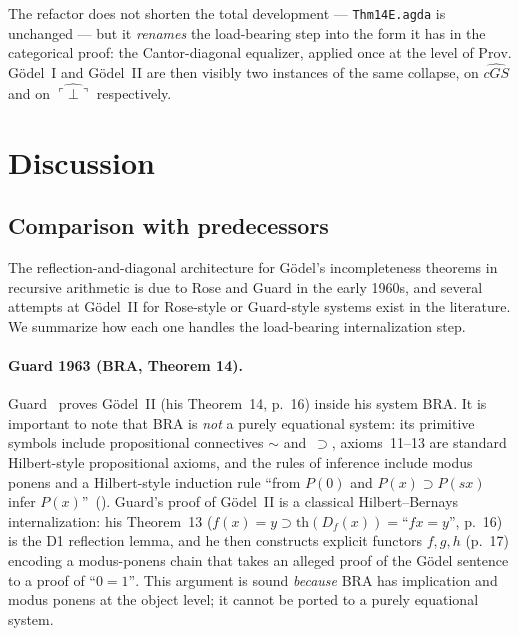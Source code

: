 \documentclass[11pt]{article}
\newcommand{\code}[1]{\ulcorner #1 \urcorner}
\newcommand{\reify}[1]{\widehat{#1}}
\begin{document}
\noindent
The refactor does not shorten the total development ---
\texttt{Thm14E.agda} is unchanged --- but it \emph{renames} the
load-bearing step into the form it has in the categorical proof:
the Cantor-diagonal equalizer, applied once at the level of
$\mathrm{Prov}$.  G\"odel~I and G\"odel~II are then visibly two
instances of the same collapse, on $\reify{\mathit{cGS}}$ and
on $\reify{\code{\bot}}$ respectively.

\section{Discussion}

\subsection*{Comparison with predecessors}

The reflection-and-diagonal architecture for G\"odel's
incompleteness theorems in recursive arithmetic is due to Rose
and Guard in the early 1960s, and several attempts at
G\"odel~II for Rose-style or Guard-style systems exist in the
literature.  We summarize how each one handles the load-bearing
internalization step.

\paragraph{Guard 1963 (BRA, Theorem 14).}
Guard~\cite{guard1963} proves G\"odel~II (his Theorem~14,
p.~16) inside his system BRA.  It is important to note that
BRA is \emph{not} a purely equational system: its primitive
symbols include propositional connectives $\sim$ and~$\supset$,
axioms~11--13 are standard Hilbert-style propositional axioms,
and the rules of inference include modus ponens and a
Hilbert-style induction rule ``from $P(0)$ and $P(x) \supset
P(sx)$ infer $P(x)$''~(\cite[p.~10]{guard1963}).  Guard's proof
of G\"odel~II is a classical Hilbert--Bernays internalization:
his Theorem~13 ($f(x) = y \supset \mathrm{th}(D_f(x)) =
\text{``}fx{=}y\text{''}$, p.~16) is the D1 reflection lemma,
and he then constructs explicit functors $f, g, h$ (p.~17)
encoding a modus-ponens chain that takes an alleged proof of
the G\"odel sentence to a proof of $\text{``}0{=}1\text{''}$.
This argument is sound \emph{because} BRA has implication and
modus ponens at the object level; it cannot be ported to a
purely equational system.
\end{document}
